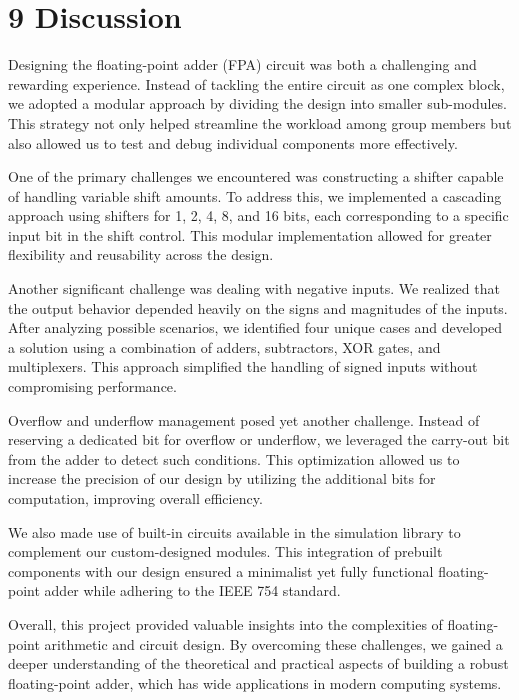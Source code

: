 \documentclass{article}
\begin{document}






\section*{9 Discussion}

Designing the floating-point adder (FPA) circuit was both a challenging and rewarding experience. Instead of tackling the entire circuit as one complex block, we adopted a modular approach by dividing the design into smaller sub-modules. This strategy not only helped streamline the workload among group members but also allowed us to test and debug individual components more effectively.

One of the primary challenges we encountered was constructing a shifter capable of handling variable shift amounts. To address this, we implemented a cascading approach using shifters for 1, 2, 4, 8, and 16 bits, each corresponding to a specific input bit in the shift control. This modular implementation allowed for greater flexibility and reusability across the design.

Another significant challenge was dealing with negative inputs. We realized that the output behavior depended heavily on the signs and magnitudes of the inputs. After analyzing possible scenarios, we identified four unique cases and developed a solution using a combination of adders, subtractors, XOR gates, and multiplexers. This approach simplified the handling of signed inputs without compromising performance.

Overflow and underflow management posed yet another challenge. Instead of reserving a dedicated bit for overflow or underflow, we leveraged the carry-out bit from the adder to detect such conditions. This optimization allowed us to increase the precision of our design by utilizing the additional bits for computation, improving overall efficiency.

We also made use of built-in circuits available in the simulation library to complement our custom-designed modules. This integration of prebuilt components with our design ensured a minimalist yet fully functional floating-point adder while adhering to the IEEE 754 standard.

Overall, this project provided valuable insights into the complexities of floating-point arithmetic and circuit design. By overcoming these challenges, we gained a deeper understanding of the theoretical and practical aspects of building a robust floating-point adder, which has wide applications in modern computing systems.
\end{document}
